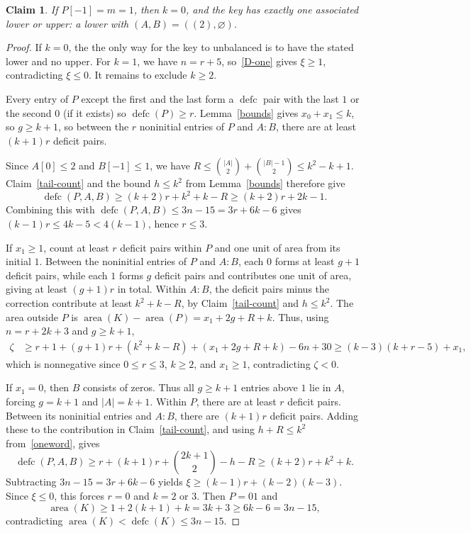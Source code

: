 \documentclass[11pt]{article}
\DeclareMathOperator{\area}{area}\DeclareMathOperator{\dinv}{dinv}
\DeclareMathOperator{\defc}{defc}\DeclareMathOperator{\sym}{sym}
\newtheorem{claim}{Claim}
\begin{document}
\begin{claim}\label{binary-maximum}
If $P[-1]=m=1$, then $k=0$, and the key has exactly one associated lower or upper: a lower with $(A,B)=((2),\varnothing)$.
\end{claim}
\begin{proof}
If $k=0$, the the only way for the key to unbalanced is to have the stated lower and no upper. For $k=1$, we have $n=r+5$, so~\eqref{D-one} gives $\xi\ge1$, contradicting $\xi\le0$. It remains to exclude $k\ge2$.

Every entry of $P$ except the first and the last form a $\defc$ pair with the last $1$ or the second $0$ (if it exists) so $\defc(P)\ge r$. Lemma~\ref{bounds} gives $x_0+x_1\le k$, so $g\ge k+1$, so between the $r$ noninitial entries of $P$ and $A:B$, there are at least $(k+1)r$ deficit pairs.

Since $A[0] \le 2$ and $B[-1] \le 1$, we have $R\le\binom{|A|}2+\binom{|B|-1}2\le k^2-k+1$. Claim~\ref{tail-count} and the bound $h\le k^2$ from Lemma~\ref{bounds} therefore give
\[
 \defc(P,A,B)\ge(k+2)r+k^2+k-R\ge(k+2)r+2k-1.
\]
Combining this with $\defc(P,A,B)\le3n-15=3r+6k-6$ gives $(k-1)r\le4k-5<4(k-1)$, hence $r\le3$.

If $x_1\ge1$, count at least $r$ deficit pairs within $P$ and one unit of area from its initial $1$.
Between the noninitial entries of $P$ and $A:B$, each $0$ forms at least $g+1$ deficit pairs, while each $1$ forms $g$ deficit pairs and contributes one unit of area, giving at least $(g+1)r$ in total.
Within $A:B$, the deficit pairs minus the correction contribute at least $k^2+k-R$, by Claim~\ref{tail-count} and $h\le k^2$.
The area outside $P$ is $\area(K)-\area(P)=x_1+2g+R+k$. Thus, using $n=r+2k+3$ and $g\ge k+1$,
\begin{align*}
 \zeta&\ge r+1+(g+1)r+(k^2+k-R)
 +(x_1+2g+R+k)-6n+30
 \ge(k-3)(k+r-5)+x_1,
\end{align*}
which is nonnegative since $0\le r\le3$, $k\ge2$, and $x_1\ge1$, contradicting $\zeta<0$.

If $x_1=0$, then $B$ consists of zeros. Thus all $g\ge k+1$ entries above $1$ lie in $A$, forcing $g=k+1$ and $|A|=k+1$. Within $P$, there are at least $r$ deficit pairs. Between its noninitial entries and $A:B$, there are $(k+1)r$ deficit pairs. Adding these to the contribution in Claim~\ref{tail-count}, and using $h+R\le k^2$ from~\eqref{oneword}, gives
\[
 \defc(P,A,B)\ge r+(k+1)r+\binom{2k+1}{2}-h-R\ge(k+2)r+k^2+k.
\]
Subtracting $3n-15=3r+6k-6$ yields $
 \xi\ge(k-1)r+(k-2)(k-3)$.
Since $\xi\le0$, this forces $r=0$ and $k=2$ or $3$. Then $P=01$ and
\[
 \area(K)\ge1+2(k+1)+k=3k+3\ge6k-6=3n-15,
\]
contradicting $\area(K)<\defc(K)\le3n-15$.
\end{proof}
\end{document}
